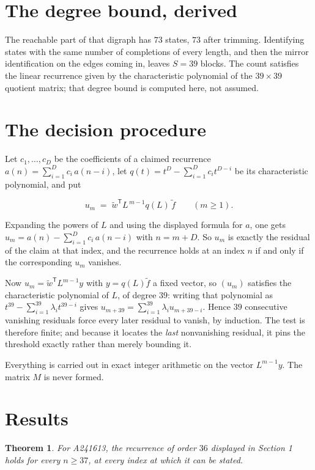 \documentclass[11pt]{article}
\newtheorem{theorem}{Theorem}
\theoremstyle{definition}
\begin{document}
\section{The degree bound, derived}

The reachable part of that digraph has $73$ states, $73$ after trimming. Identifying states with the same number of completions of every length, and then the mirror identification on the edges coming in, leaves $S = 39$ blocks. The count satisfies the linear recurrence given by the characteristic polynomial of the $39\times39$ quotient matrix; that degree bound is computed here, not assumed.

\section{The decision procedure}

Let $c_1,\dots,c_D$ be the coefficients of a claimed recurrence $a(n) = \sum_{i=1}^{D} c_i\,a(n-i)$, let $q(t) = t^{D} - \sum_{i=1}^{D} c_i t^{D-i}$ be its characteristic polynomial, and put

\[u_m \;=\; \tilde w^{\mathsf T} L^{\,m-1} q(L)\,\tilde f \qquad (m \ge 1).\]

Expanding the powers of $L$ and using the displayed formula for $a$, one gets $u_m = a(n) - \sum_{i=1}^{D} c_i\,a(n-i)$ with $n = m + D$. So $u_m$ is exactly the residual of the claim at that index, and the recurrence holds at an index $n$ if and only if the corresponding $u_m$ vanishes.

Now $u_m = \tilde w^{\mathsf T} L^{m-1} y$ with $y = q(L)\tilde f$ a fixed vector, so $(u_m)$ satisfies the characteristic polynomial of $L$, of degree $39$: writing that polynomial as $t^{39} - \sum_{i=1}^{39} \lambda_i t^{39-i}$ gives $u_{m+39} = \sum_{i=1}^{39} \lambda_i u_{m+39-i}$. Hence $39$ consecutive vanishing residuals force every later residual to vanish, by induction. The test is therefore finite; and because it locates the {\itshape last} nonvanishing residual, it pins the threshold exactly rather than merely bounding it.

Everything is carried out in exact integer arithmetic on the vector $L^{m-1}y$. The matrix $M$ is never formed.

\section{Results}

\begin{theorem} For A241613, the recurrence of order $36$ displayed in Section 1 holds for every $n \ge 37$, at every index at which it can be stated.\end{theorem}
\end{document}
